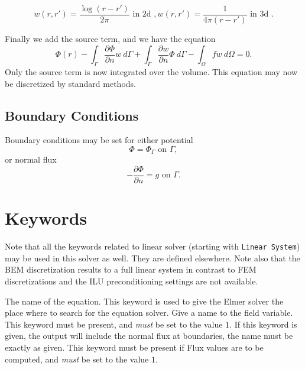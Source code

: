 \begin{equation}
 w(r,r') = \frac{\log(r-r')}{2\pi} \mbox{ in 2d }, 
 w(r,r') = \frac{1}{4\pi(r-r')} \mbox{ in 3d }.
\end{equation}

Finally we add the source term, and we have the equation
\begin{equation}
\Phi(r) -
\int_\Gamma \frac{\partial\Phi}{\partial n} w\ d\Gamma +
\int_\Gamma \frac{\partial w}{\partial n} \Phi\ d\Gamma - \int_\Omega fw\ d\Omega = 0.
\end{equation}
Only the source term is now integrated over the volume.
This equation may now be discretized by standard methods.

\subsection{Boundary Conditions}

Boundary conditions may be set for either potential
\begin{equation}
\Phi = \Phi_\Gamma \mbox{ on } \Gamma,
\end{equation}
or normal flux
\begin{equation}
-\frac{\partial \Phi}{\partial n} = g \mbox{ on } \Gamma.
\end{equation}


\section{Keywords} 

\sifbegin

Note that all the keywords related to linear solver (starting with {\tt Linear System})
may be used in this solver as well.
They are defined elsewhere.  Note also that the BEM discretization
results to a full linear system in contrast to FEM discretizations
and the ILU preconditioning settings are not available.

\sifbegin
{} 
The name of the equation.
This keyword is used to give the Elmer solver the place where
to search for the  equation solver.
Give a name to the field variable.
This keyword must be present, and {\it must} be set to the value $1$.
If this keyword is given, the output will include the normal flux at
boundaries, the name must be exactly as given.
This keyword must be present if Flux values are to be computed,
and {\it must} be set to the value $1$.
\sifend

